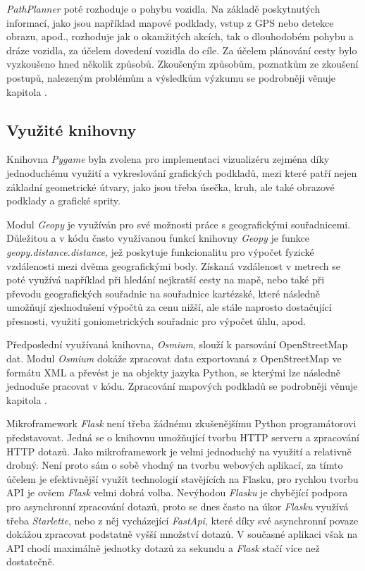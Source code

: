 \documentclass[czech, bachelor]{diploma}
\begin{document}
\emph{PathPlanner} poté rozhoduje o pohybu vozidla. Na základě poskytnutých informací, jako jsou například mapové podklady, vstup
z GPS nebo detekce obrazu, apod., rozhoduje jak o okamžitých akcích, tak o dlouhodobém pohybu a dráze vozidla, za účelem dovedení
vozidla do cíle. Za účelem plánování cesty bylo vyzkoušeno hned několik způsobů. Zkoušeným způsobům, poznatkům ze zkoušení
postupů, nalezeným problémům a výsledkům výzkumu se podrobněji věnuje kapitola .

\subsection{Využité knihovny}

Knihovna \emph{Pygame} byla zvolena pro implementaci vizualizéru zejména díky jednoduchému využití a vykreslování grafických
podkladů, mezi které patří nejen základní geometrické útvary, jako jsou třeba úsečka, kruh, ale také obrazové podklady a grafické
sprity.

Modul \emph{Geopy} je využíván pro své možnosti práce s geografickými souřadnicemi. Důležitou a v kódu často využívanou funkcí
knihovny \emph{Geopy} je funkce \emph{geopy.distance.distance}, jež poskytuje funkcionalitu pro výpočet fyzické vzdálenosti mezi
dvěma geografickými body. Získaná vzdálenost v metrech se poté využívá například při hledání nejkratší cesty na mapě, nebo také
při převodu geografických souřadnic na souřadnice kartézské, které následně umožňují zjednodušení výpočtů za cenu nižší, ale stále
naprosto dostačující přesnosti, využití goniometrických souřadnic pro výpočet úhlu, apod.

Předposlední využívaná knihovna, \emph{Osmium}, slouží k parsování OpenStreetMap dat. Modul \emph{Osmium} dokáže zpracovat data
exportovaná z OpenStreetMap ve formátu XML a převést je na objekty jazyka Python, se kterými lze následně jednoduše pracovat
v kódu. Zpracování mapových podkladů se podrobněji věnuje kapitola .

Mikroframework \emph{Flask} není třeba žádnému zkušenějšímu Python programátorovi představovat. Jedná se o knihovnu umožňující
tvorbu HTTP serveru a zpracování HTTP dotazů. Jako mikroframework je velmi jednoduchý na využití a relativně drobný. Není proto
sám o sobě vhodný na tvorbu webových aplikací, za tímto účelem je efektivnější využít technologií stavějících na Flasku, pro
rychlou tvorbu API je ovšem \emph{Flask} velmi dobrá volba. Nevýhodou \emph{Flasku} je chybějící podpora pro asynchronní
zpracování dotazů, proto se dnes často na úkor \emph{Flasku} využívá třeba \emph{Starlette}, nebo z něj vycházející
\emph{FastApi}, které díky své asynchronní povaze dokážou zpracovat podstatně vyšší množství dotazů. V současné aplikaci však
na API chodí maximálně jednotky dotazů za sekundu a \emph{Flask} stačí více než dostatečně.
\end{document}
